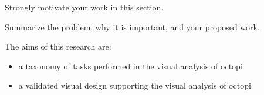 
Strongly motivate your work in this section.

Summarize the problem, why it is important, and your proposed work.

The aims of this research are:
\begin{itemize}
  \item a taxonomy of tasks performed in the visual analysis of octopi 
  \item a validated visual design supporting the visual analysis of octopi
\end{itemize}

